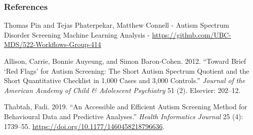 \documentclass[]{article}
\begin{document}
\hypertarget{references}{%
\subsubsection{References}\label{references}}

Thomas Pin and Tejas Phaterpekar, Matthew Connell - Autism Spectrum
Disorder Screening Machine Learning Analysis -
\url{https://github.com/UBC-MDS/522-Workflows-Group-414}

\hypertarget{refs}{}
\leavevmode\hypertarget{ref-allison2012toward}{}%
Allison, Carrie, Bonnie Auyeung, and Simon Baron-Cohen. 2012. ``Toward
Brief `Red Flags' for Autism Screening: The Short Autism Spectrum
Quotient and the Short Quantitative Checklist in 1,000 Cases and 3,000
Controls.'' \emph{Journal of the American Academy of Child \& Adolescent
Psychiatry} 51 (2). Elsevier: 202--12.

\leavevmode\hypertarget{ref-Fadi}{}%
Thabtah, Fadi. 2019. ``An Accessible and Efficient Autism Screening
Method for Behavioural Data and Predictive Analyses.'' \emph{Health
Informatics Journal} 25 (4): 1739--55.
\url{https://doi.org/10.1177/1460458218796636}.
\end{document}
